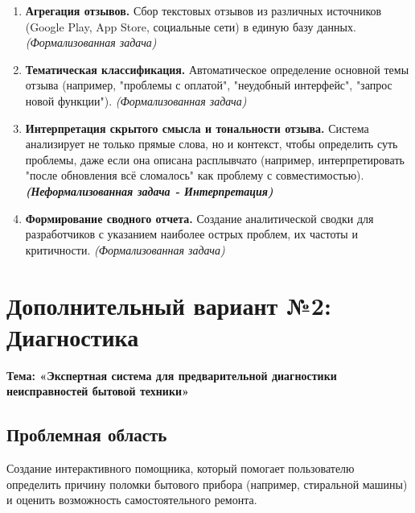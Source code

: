\documentclass[12pt, a4paper]{article}
\begin{document}
\begin{enumerate}
    \item \textbf{Агрегация отзывов.} Сбор текстовых отзывов из различных источников (Google Play, App Store, социальные сети) в единую базу данных.
    \textit{(Формализованная задача)}

    \item \textbf{Тематическая классификация.} Автоматическое определение основной темы отзыва (например, "проблемы с оплатой", "неудобный интерфейс", "запрос новой функции").
    \textit{(Формализованная задача)}

    \item \textbf{Интерпретация скрытого смысла и тональности отзыва.} Система анализирует не только прямые слова, но и контекст, чтобы определить суть проблемы, даже если она описана расплывчато (например, интерпретировать "после обновления всё сломалось" как проблему с совместимостью).
    \textit{\textbf{(Неформализованная задача - Интерпретация)}}

    \item \textbf{Формирование сводного отчета.} Создание аналитической сводки для разработчиков с указанием наиболее острых проблем, их частоты и критичности.
    \textit{(Формализованная задача)}
\end{enumerate}


\newpage
\section*{Дополнительный вариант №2: Диагностика}

\textbf{Тема: «Экспертная система для предварительной диагностики неисправностей бытовой техники»}

\subsection*{Проблемная область}

Создание интерактивного помощника, который помогает пользователю определить причину поломки бытового прибора (например, стиральной машины) и оценить возможность самостоятельного ремонта.
\end{document}
